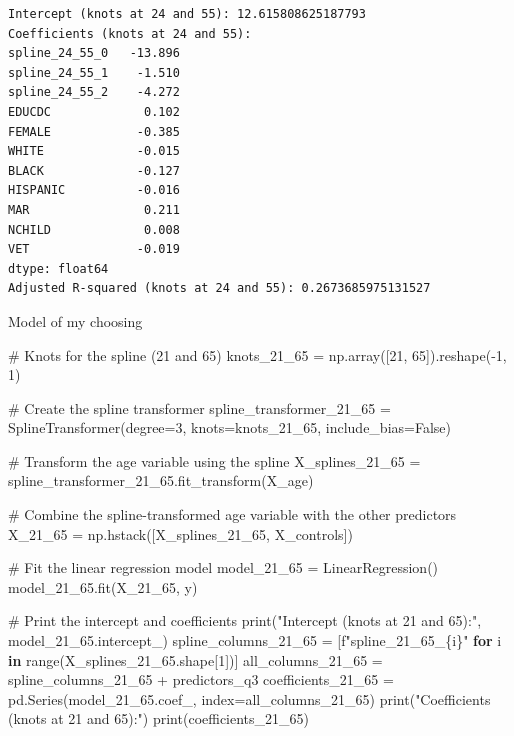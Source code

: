 \documentclass[
  11pt,
  letterpaper,
  DIV=11,
  numbers=noendperiod]{scrartcl}
\newenvironment{Shaded}{\begin{snugshade}}{\end{snugshade}}
\newcommand{\BuiltInTok}[1]{\textcolor[rgb]{0.00,0.23,0.31}{#1}}
\newcommand{\CommentTok}[1]{\textcolor[rgb]{0.37,0.37,0.37}{#1}}
\newcommand{\ControlFlowTok}[1]{\textcolor[rgb]{0.00,0.23,0.31}{\textbf{#1}}}
\newcommand{\DecValTok}[1]{\textcolor[rgb]{0.68,0.00,0.00}{#1}}
\newcommand{\KeywordTok}[1]{\textcolor[rgb]{0.00,0.23,0.31}{\textbf{#1}}}
\newcommand{\NormalTok}[1]{\textcolor[rgb]{0.00,0.23,0.31}{#1}}
\newcommand{\OperatorTok}[1]{\textcolor[rgb]{0.37,0.37,0.37}{#1}}
\newcommand{\SpecialCharTok}[1]{\textcolor[rgb]{0.37,0.37,0.37}{#1}}
\newcommand{\SpecialStringTok}[1]{\textcolor[rgb]{0.13,0.47,0.30}{#1}}
\newcommand{\StringTok}[1]{\textcolor[rgb]{0.13,0.47,0.30}{#1}}
\newcommand{\VariableTok}[1]{\textcolor[rgb]{0.07,0.07,0.07}{#1}}
\begin{document}
\begin{verbatim}
Intercept (knots at 24 and 55): 12.615808625187793
Coefficients (knots at 24 and 55):
spline_24_55_0   -13.896
spline_24_55_1    -1.510
spline_24_55_2    -4.272
EDUCDC             0.102
FEMALE            -0.385
WHITE             -0.015
BLACK             -0.127
HISPANIC          -0.016
MAR                0.211
NCHILD             0.008
VET               -0.019
dtype: float64
Adjusted R-squared (knots at 24 and 55): 0.2673685975131527
\end{verbatim}

Model of my choosing

\begin{Shaded}
\begin{Highlighting}[]
\CommentTok{\# Knots for the spline (21 and 65)}
\NormalTok{knots\_21\_65 }\OperatorTok{=}\NormalTok{ np.array([}\DecValTok{21}\NormalTok{, }\DecValTok{65}\NormalTok{]).reshape(}\OperatorTok{{-}}\DecValTok{1}\NormalTok{, }\DecValTok{1}\NormalTok{)}

\CommentTok{\# Create the spline transformer}
\NormalTok{spline\_transformer\_21\_65 }\OperatorTok{=}\NormalTok{ SplineTransformer(degree}\OperatorTok{=}\DecValTok{3}\NormalTok{, knots}\OperatorTok{=}\NormalTok{knots\_21\_65, include\_bias}\OperatorTok{=}\VariableTok{False}\NormalTok{)}

\CommentTok{\# Transform the age variable using the spline}
\NormalTok{X\_splines\_21\_65 }\OperatorTok{=}\NormalTok{ spline\_transformer\_21\_65.fit\_transform(X\_age)}

\CommentTok{\# Combine the spline{-}transformed age variable with the other predictors}
\NormalTok{X\_21\_65 }\OperatorTok{=}\NormalTok{ np.hstack([X\_splines\_21\_65, X\_controls])}

\CommentTok{\# Fit the linear regression model}
\NormalTok{model\_21\_65 }\OperatorTok{=}\NormalTok{ LinearRegression()}
\NormalTok{model\_21\_65.fit(X\_21\_65, y)}

\CommentTok{\# Print the intercept and coefficients}
\BuiltInTok{print}\NormalTok{(}\StringTok{"Intercept (knots at 21 and 65):"}\NormalTok{, model\_21\_65.intercept\_)}
\NormalTok{spline\_columns\_21\_65 }\OperatorTok{=}\NormalTok{ [}\SpecialStringTok{f"spline\_21\_65\_}\SpecialCharTok{\{}\NormalTok{i}\SpecialCharTok{\}}\SpecialStringTok{"} \ControlFlowTok{for}\NormalTok{ i }\KeywordTok{in} \BuiltInTok{range}\NormalTok{(X\_splines\_21\_65.shape[}\DecValTok{1}\NormalTok{])]}
\NormalTok{all\_columns\_21\_65 }\OperatorTok{=}\NormalTok{ spline\_columns\_21\_65 }\OperatorTok{+}\NormalTok{ predictors\_q3}
\NormalTok{coefficients\_21\_65 }\OperatorTok{=}\NormalTok{ pd.Series(model\_21\_65.coef\_, index}\OperatorTok{=}\NormalTok{all\_columns\_21\_65)}
\BuiltInTok{print}\NormalTok{(}\StringTok{"Coefficients (knots at 21 and 65):"}\NormalTok{)}
\BuiltInTok{print}\NormalTok{(coefficients\_21\_65)}


\end{Highlighting}
\end{Shaded}
\end{document}
